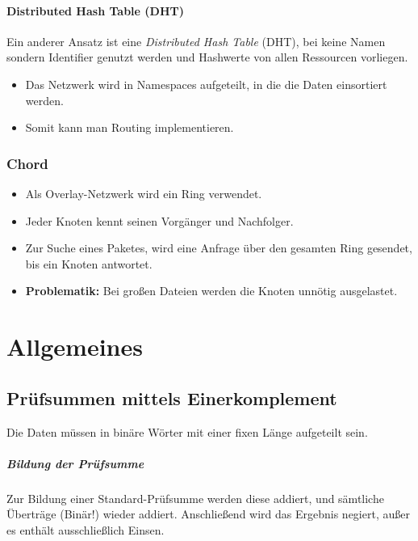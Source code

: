 \documentclass[a4paper, 11pt, accentcolor = tud3b]{tudreport}
\begin{document}
                \subsubsection{Distributed Hash Table (DHT)}
	                Ein anderer Ansatz ist eine \textit{Distributed Hash Table} (DHT), bei keine Namen sondern Identifier genutzt werden und Hashwerte von allen Ressourcen vorliegen.
	                
	                \begin{itemize}
	                	\item Das Netzwerk wird in Namespaces aufgeteilt, in die die Daten einsortiert werden.
	                	\item Somit kann man Routing implementieren.
	                \end{itemize}
                
                \subsection{Chord}
	                \begin{itemize}
	                	\item Als Overlay-Netzwerk wird ein Ring verwendet.
	                	\item Jeder Knoten kennt seinen Vorgänger und Nachfolger.
	                	\item Zur Suche eines Paketes, wird eine Anfrage über den gesamten Ring gesendet, bis ein Knoten antwortet.
	                	\item \textbf{Problematik:} Bei großen Dateien werden die Knoten unnötig ausgelastet.
	                \end{itemize}
	
	\chapter{Allgemeines}
		\section{Prüfsummen mittels Einerkomplement}
			\label{sec:checksum_onescomplement}
		
			Die Daten müssen in binäre Wörter mit einer fixen Länge aufgeteilt sein.
			
			\paragraph{Bildung der Prüfsumme}
				Zur Bildung einer Standard-Prüfsumme werden diese addiert, und sämtliche Überträge (Binär!) wieder addiert. Anschließend wird das Ergebnis negiert, außer es enthält ausschließlich Einsen.
				
\end{document}
